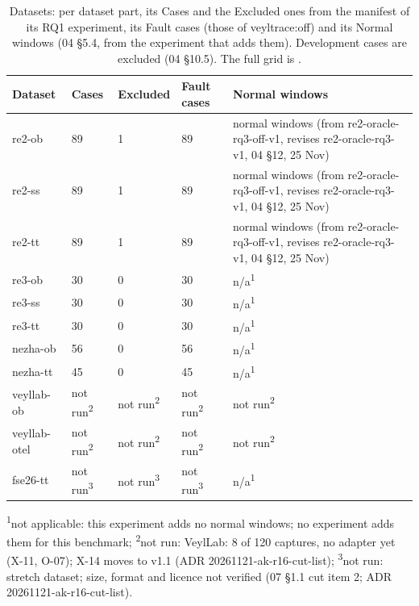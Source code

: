 \begin{table}[t]
\centering
\caption{Datasets: per dataset part, its Cases and the Excluded ones from the manifest of its RQ1 experiment, its Fault cases (those of veyltrace:off) and its Normal windows (04 \S{}5.4, from the experiment that adds them). Development cases are excluded (04 \S{}10.5). The full grid is .}
\label{tab:t03-datasets-paper}
\footnotesize
\setlength{\tabcolsep}{3pt}%
\begin{tabularx}{\linewidth}{@{}llll>{\raggedright\arraybackslash}X@{}}
\hline
Dataset & Cases & Excluded & Fault cases & Normal windows \\
\hline
re2-ob & 89 & 1 & 89 & 89 normal windows (from re2-oracle-rq3-off-v1, revises re2-oracle-rq3-v1, 04 \S{}12, 25 Nov) \\
re2-ss & 89 & 1 & 89 & 89 normal windows (from re2-oracle-rq3-off-v1, revises re2-oracle-rq3-v1, 04 \S{}12, 25 Nov) \\
re2-tt & 89 & 1 & 89 & 89 normal windows (from re2-oracle-rq3-off-v1, revises re2-oracle-rq3-v1, 04 \S{}12, 25 Nov) \\
re3-ob & 30 & 0 & 30 & n/a\textsuperscript{1} \\
re3-ss & 30 & 0 & 30 & n/a\textsuperscript{1} \\
re3-tt & 30 & 0 & 30 & n/a\textsuperscript{1} \\
nezha-ob & 56 & 0 & 56 & n/a\textsuperscript{1} \\
nezha-tt & 45 & 0 & 45 & n/a\textsuperscript{1} \\
veyllab-ob & not run\textsuperscript{2} & not run\textsuperscript{2} & not run\textsuperscript{2} & not run\textsuperscript{2} \\
veyllab-otel & not run\textsuperscript{2} & not run\textsuperscript{2} & not run\textsuperscript{2} & not run\textsuperscript{2} \\
fse26-tt & not run\textsuperscript{3} & not run\textsuperscript{3} & not run\textsuperscript{3} & n/a\textsuperscript{1} \\
\hline
\end{tabularx}
\par\smallskip\scriptsize\raggedright
\textsuperscript{1}not applicable: this experiment adds no normal windows; no experiment adds them for this benchmark; \textsuperscript{2}not run: VeylLab: 8 of 120 captures, no adapter yet (X-11, O-07); X-14 moves to v1.1 (ADR 20261121-ak-r16-cut-list); \textsuperscript{3}not run: stretch dataset; size, format and licence not verified (07 \S{}1.1 cut item 2; ADR 20261121-ak-r16-cut-list).\par

\end{table}

